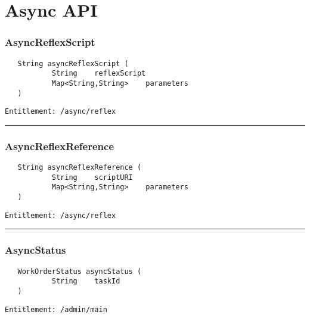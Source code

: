 \chapter{Async API}

\subsection{AsyncReflexScript}
\label{Api:AsyncReflexScript}
\begin{Verbatim}
   String asyncReflexScript (
           String    reflexScript
           Map<String,String>    parameters
   )
\end{Verbatim}
\begin{Verbatim}[formatcom=\color{Maroon}]
  Entitlement: /async/reflex
\end{Verbatim}



\rule{12cm}{2pt}
\subsection{AsyncReflexReference}
\label{Api:AsyncReflexReference}
\begin{Verbatim}
   String asyncReflexReference (
           String    scriptURI
           Map<String,String>    parameters
   )
\end{Verbatim}
\begin{Verbatim}[formatcom=\color{Maroon}]
  Entitlement: /async/reflex
\end{Verbatim}



\rule{12cm}{2pt}
\subsection{AsyncStatus}
\label{Api:AsyncStatus}
\begin{Verbatim}
   WorkOrderStatus asyncStatus (
           String    taskId
   )
\end{Verbatim}
\begin{Verbatim}[formatcom=\color{Maroon}]
  Entitlement: /admin/main
\end{Verbatim}



